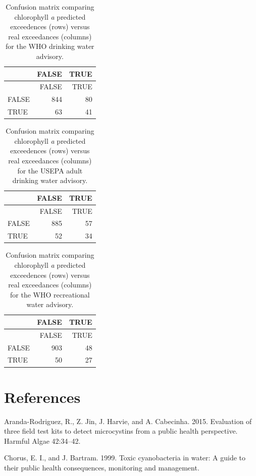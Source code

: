 \documentclass[11pt,]{article}
\begin{document}
\newpage

\begin{longtable}[c]{@{}lrr@{}}
\caption{Confusion matrix comparing chlorophyll \textit{a} predicted
exceedences (rows) versus real exceedances (columns) for the WHO
drinking water advisory.
\label{tab:who_drink_conmat_table}}\tabularnewline
\toprule
& FALSE & TRUE\tabularnewline
\midrule
\endfirsthead
\toprule
& FALSE & TRUE\tabularnewline
\midrule
\endhead
FALSE & 844 & 80\tabularnewline
TRUE & 63 & 41\tabularnewline
\bottomrule
\end{longtable}

\newpage

\begin{longtable}[c]{@{}lrr@{}}
\caption{Confusion matrix comparing chlorophyll \textit{a} predicted
exceedences (rows) versus real exceedances (columns) for the USEPA adult
drinking water advisory. \label{tab:adult_conmat_table}}\tabularnewline
\toprule
& FALSE & TRUE\tabularnewline
\midrule
\endfirsthead
\toprule
& FALSE & TRUE\tabularnewline
\midrule
\endhead
FALSE & 885 & 57\tabularnewline
TRUE & 52 & 34\tabularnewline
\bottomrule
\end{longtable}

\newpage

\begin{longtable}[c]{@{}lrr@{}}
\caption{Confusion matrix comparing chlorophyll \textit{a} predicted
exceedences (rows) versus real exceedances (columns) for the WHO
recreational water advisory.
\label{tab:who_rec_conmat_table}}\tabularnewline
\toprule
& FALSE & TRUE\tabularnewline
\midrule
\endfirsthead
\toprule
& FALSE & TRUE\tabularnewline
\midrule
\endhead
FALSE & 903 & 48\tabularnewline
TRUE & 50 & 27\tabularnewline
\bottomrule
\end{longtable}

\newpage

\section*{References}\label{references}

Aranda-Rodriguez, R., Z. Jin, J. Harvie, and A. Cabecinha. 2015.
Evaluation of three field test kits to detect microcystins from a public
health perspective. Harmful Algae 42:34--42.

Chorus, E. I., and J. Bartram. 1999. Toxic cyanobacteria in water: A
guide to their public health consequences, monitoring and management.
\end{document}
